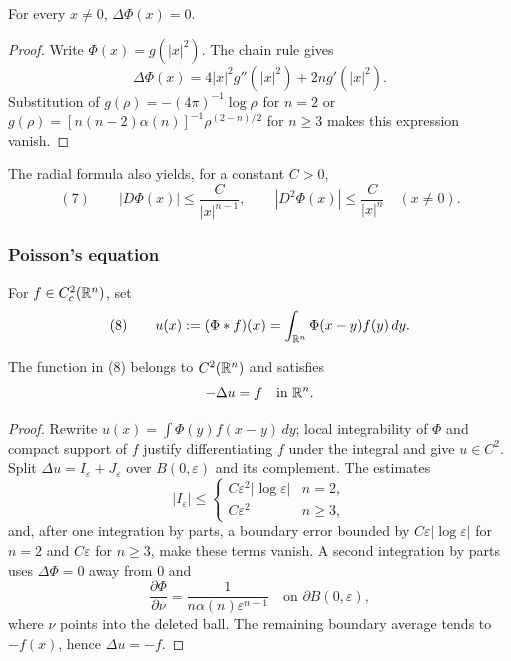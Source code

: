 \begin{lemma}
\label{lem:laplace-fundamental-solution-harmonic}





For every $x\ne0$, $\Delta\Phi(x)=0$.
\end{lemma}
\begin{proof}

\sketch Write $\Phi(x)=g(|x|^2)$. The chain rule gives
$$\Delta\Phi(x)=4|x|^2g''(|x|^2)+2n g'(|x|^2).$$
Substitution of $g(\rho)=-(4\pi)^{-1}\log\rho$ for $n=2$ or
$g(\rho)=[n(n-2)\alpha(n)]^{-1}\rho^{(2-n)/2}$ for $n\ge3$ makes this
expression vanish.
\end{proof}

The radial formula also yields, for a constant $C>0$,
$$(7)\qquad
|D\Phi(x)|\le \frac{C}{|x|^{n-1}},
\qquad
|D^2\Phi(x)|\le \frac{C}{|x|^n}
\quad(x\ne0).$$

\subsubsection{Poisson's equation}
\label{sec:laplace-poissons-equation}

For $f\in C_c^2(\mathbb{R}^n)$, set
$$(8)\qquad u(x):=(\Phi*f)(x)=\int_{\mathbb{R}^n}\Phi(x-y)f(y)\,dy.$$

\begin{theorem}
\label{thm:poisson-equation-solution-formula}

The function in (8) belongs to $C^2(\mathbb{R}^n)$ and satisfies
$$-\Delta u=f\quad\text{in }\mathbb{R}^n.$$
\end{theorem}
\begin{proof}
\sketch Rewrite $u(x)=\int\Phi(y)f(x-y)\,dy$; local integrability of $\Phi$
and compact support of $f$ justify differentiating $f$ under the integral and
give $u\in C^2$. Split $\Delta u=I_\varepsilon+J_\varepsilon$ over
$B(0,\varepsilon)$ and its complement. The estimates
$$|I_\varepsilon|\le
\begin{cases}C\varepsilon^2|\log\varepsilon|&n=2,\\
C\varepsilon^2&n\ge3,
\end{cases}$$
and, after one integration by parts, a boundary error bounded by
$C\varepsilon|\log\varepsilon|$ for $n=2$ and $C\varepsilon$ for $n\ge3$,
make these terms vanish. A second integration by parts uses
$\Delta\Phi=0$ away from $0$ and
$$\frac{\partial\Phi}{\partial\nu}
=\frac{1}{n\alpha(n)\varepsilon^{n-1}}
\quad\text{on }\partial B(0,\varepsilon),$$
where $\nu$ points into the deleted ball. The remaining boundary average tends
to $-f(x)$, hence $\Delta u=-f$.
\end{proof}

